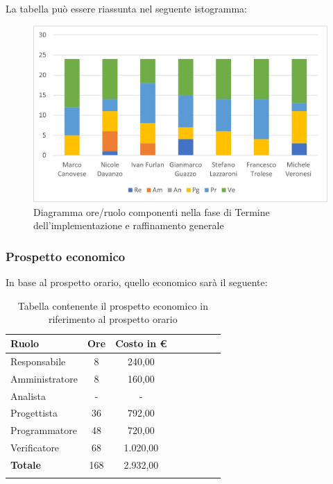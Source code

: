 La tabella può essere riassunta nel seguente istogramma:

\begin{figure}[H]
	\centering
	\includegraphics[width=0.8\linewidth]{res/images/preventivo/6-1.png}
	\caption{Diagramma ore/ruolo componenti nella fase di Termine dell'implementazione e raffinamento generale}
	\label{fig:diagramma suddivisione ruoli fase Termine dell'implementazione e raffinamento generale}
\end{figure}

\subsubsection{Prospetto economico}
In base al prospetto orario, quello economico sarà il seguente:

\begin{longtable}{|l|c|c|c|c|c|c|c|}
	\hline
	\rowcolor{lighter-grayer}
	\textbf{Ruolo}  & \textbf{Ore} & \textbf{Costo in €} \\
	\hline
	\endfirsthead

	\hline
	Responsabile    & 8            & 240,00              \\
	\hline
	\hline
	Amministratore  & 8            & 160,00              \\
	\hline
	\hline
	Analista        & -            & -                   \\
	\hline
	\hline
	Progettista     & 36           & 792,00              \\
	\hline
	\hline
	Programmatore   & 48           & 720,00              \\
	\hline
	\hline
	Verificatore    & 68           & 1.020,00            \\
	\hline
	\hline
	\textbf{Totale} & 168          & 2.932,00            \\
	\hline
	\rowcolor{white}
	\caption{Tabella contenente il prospetto economico in riferimento al prospetto orario}
\end{longtable}
\pagebreak

